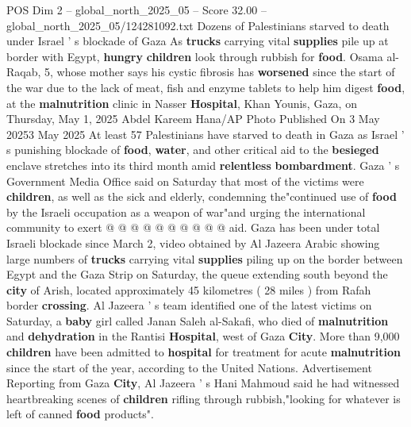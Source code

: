 \begin{textsample}{POS Dim 2 – global\_north\_2025\_05 – Score 32.00 – global\_north\_2025\_05/124281092.txt}  \label{ex:f2_pos_211}
Dozens of Palestinians starved to death under Israel ' s blockade of Gaza As \textbf{trucks} carrying vital \textbf{supplies} pile up at border with Egypt, \textbf{hungry} \textbf{children} look through rubbish for \textbf{food}.
Osama al-Raqab, 5, whose mother says his cystic fibrosis has \textbf{worsened} since the start of the war due to the lack of meat, fish and enzyme tablets to help him digest \textbf{food}, at the \textbf{malnutrition} clinic in Nasser \textbf{Hospital}, Khan Younis, Gaza, on Thursday, May 1, 2025 Abdel Kareem Hana/AP Photo Published On 3 May 20253 May 2025 At least 57 Palestinians have starved to death in Gaza as Israel ' s punishing blockade of \textbf{food}, \textbf{water}, and other critical aid to the \textbf{besieged} enclave stretches into its third month amid \textbf{relentless} \textbf{bombardment}.
Gaza ' s Government Media Office said on Saturday that most of the victims were \textbf{children}, as well as the sick and elderly, condemning the"continued use of \textbf{food} by the Israeli occupation as a weapon of war"and urging the international community to exert @ @ @ @ @ @ @ @ @ @ aid.
Gaza has been under total Israeli blockade since March 2, video obtained by Al Jazeera Arabic showing large numbers of \textbf{trucks} carrying vital \textbf{supplies} piling up on the border between Egypt and the Gaza Strip on Saturday, the queue extending south beyond the \textbf{city} of Arish, located approximately 45 kilometres ( 28 miles ) from Rafah border \textbf{crossing}.
Al Jazeera ' s team identified one of the latest victims on Saturday, a \textbf{baby} girl called Janan Saleh al-Sakafi, who died of \textbf{malnutrition} and \textbf{dehydration} in the Rantisi \textbf{Hospital}, west of Gaza \textbf{City}.
More than 9,000 \textbf{children} have been admitted to \textbf{hospital} for treatment for acute \textbf{malnutrition} since the start of the year, according to the United Nations.
Advertisement Reporting from Gaza \textbf{City}, Al Jazeera ' s Hani Mahmoud said he had witnessed heartbreaking scenes of \textbf{children} rifling through rubbish,"looking for whatever is left of canned \textbf{food} products".

\end{textsample}
